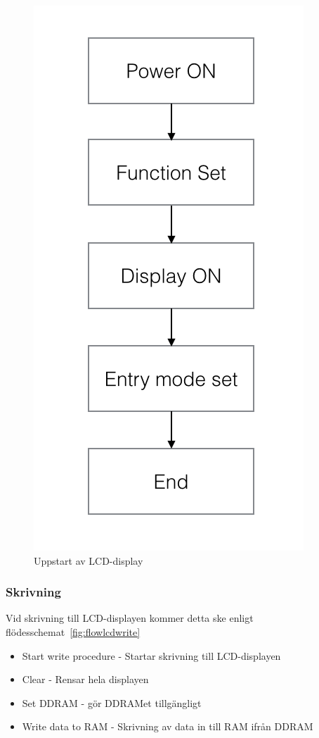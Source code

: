 \documentclass[a4paper,12pt,fleqn]{article}
\begin{document}
\begin{figure}[htp]
	  \begin{center}
	  \includegraphics[keepaspectratio=true,scale=0.4]{startup}  %
	  \end{center}
	  \caption{Uppstart av LCD-display} %
	  \label{fig:flowlcdstart}
	\end{figure}

\newpage


\subsubsection{Skrivning}

Vid skrivning till LCD-displayen kommer detta ske enligt flödesschemat~\ref{fig:flowlcdwrite}
\begin{itemize}
  \item Start write procedure - Startar skrivning till LCD-displayen
  \item Clear - Rensar hela displayen
  \item Set DDRAM - gör DDRAMet tillgängligt
  \item Write data to RAM - Skrivning av data in till RAM ifrån DDRAM
\end{itemize}
\end{document}
